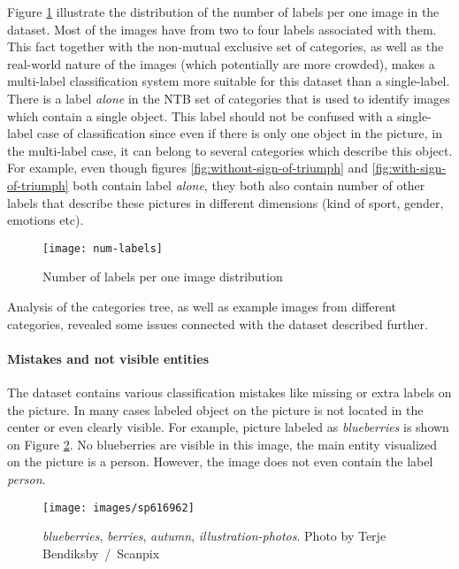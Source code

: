 Figure \ref{fig:num-labels} illustrate the distribution of the number of labels per one image in the dataset. Most of the images have from two to four labels associated with them. This fact together with the non-mutual exclusive set of categories, as well as the real-world nature of the images (which potentially are more crowded), makes a multi-label classification system more suitable for this dataset than a single-label. There is a label \textit{alone} in the NTB set of categories that is used to identify images which contain a single object. This label should not be confused with a single-label case of classification since even if there is only one object in the picture, in the multi-label case, it can belong to several categories which describe this object. For example, even though figures \ref{fig:without-sign-of-triumph} and \ref{fig:with-sign-of-triumph} both contain label \textit{alone}, they both also contain number of other labels that describe these pictures in different dimensions (kind of sport, gender, emotions etc).

\begin{figure}[h!]
    \centering
    \texttt{[image: num-labels]}
    \caption{Number of labels per one image distribution}
    \label{fig:num-labels}
\end{figure}

Analysis of the categories tree, as well as example images from different categories, revealed some issues connected with the dataset described further.

\paragraph{Mistakes and not visible entities}
The dataset contains various classification mistakes like missing or extra labels on the picture. In many cases labeled object on the picture is not located in the center or even clearly visible. For example, picture labeled as \textit{blueberries} is shown on Figure \ref{fig:image-blueberries}. No blueberries are visible in this image, the main entity visualized on the picture is a person. However, the image does not even contain the label \textit{person}. 

\begin{figure}[h]
    \centering
    \texttt{[image: images/sp616962]}
    \caption[Example picture from the \textit{blueberries} category]{\textit{blueberries}, \textit{berries}, \textit{autumn}, \textit{illustration-photos}. Photo by Terje Bendiksby~/~Scanpix}
    \label{fig:image-blueberries}
\end{figure}


